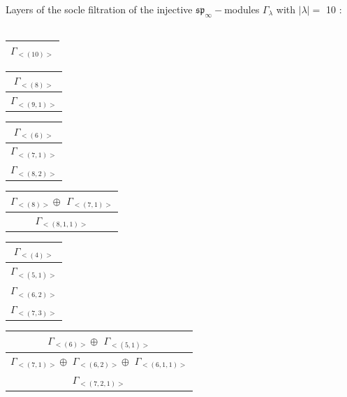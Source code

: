 \bigskip
Layers of the socle filtration of the injective $\mathfrak{sp}_\infty-$modules $\Gamma_{\lambda}$ with $|\lambda| = $ 10 : \\\\
\begin{minipage}{.2\textwidth}
\centering
\begin{tabular}{|c|}\hline
$\Gamma_{<(
10
)>}$
\\
\hline\end{tabular}\end{minipage}
\begin{minipage}{.2\textwidth}
\centering
\begin{tabular}{|c|}\hline
$\Gamma_{<(
8
)>}$
\\ \hline
$\Gamma_{<(
9 , 
1
)>}$
\\
\hline\end{tabular}\end{minipage}
\begin{minipage}{.2\textwidth}
\centering
\begin{tabular}{|c|}\hline
$\Gamma_{<(
6
)>}$
\\ \hline
$\Gamma_{<(
7 , 
1
)>}$
\\ \hline
$\Gamma_{<(
8 , 
2
)>}$
\\
\hline\end{tabular}\end{minipage}
\begin{minipage}{.2\textwidth}
\centering
\begin{tabular}{|c|}\hline
$\Gamma_{<(
8
)>} \oplus$
$\Gamma_{<(
7 , 
1
)>}$
\\ \hline
$\Gamma_{<(
8 , 
1 , 
1
)>}$
\\
\hline\end{tabular}\end{minipage}
\begin{minipage}{.2\textwidth}
\centering
\begin{tabular}{|c|}\hline
$\Gamma_{<(
4
)>}$
\\ \hline
$\Gamma_{<(
5 , 
1
)>}$
\\ \hline
$\Gamma_{<(
6 , 
2
)>}$
\\ \hline
$\Gamma_{<(
7 , 
3
)>}$
\\
\hline\end{tabular}\end{minipage}
\bigskip
\begin{minipage}{.4\textwidth}
\centering
\begin{tabular}{|c|}\hline
$\Gamma_{<(
6
)>} \oplus$
$\Gamma_{<(
5 , 
1
)>}$
\\ \hline
$\Gamma_{<(
7 , 
1
)>} \oplus$
$\Gamma_{<(
6 , 
2
)>} \oplus$
$\Gamma_{<(
6 , 
1 , 
1
)>}$
\\ \hline
$\Gamma_{<(
7 , 
2 , 
1
)>}$
\\
\hline\end{tabular}\end{minipage}
